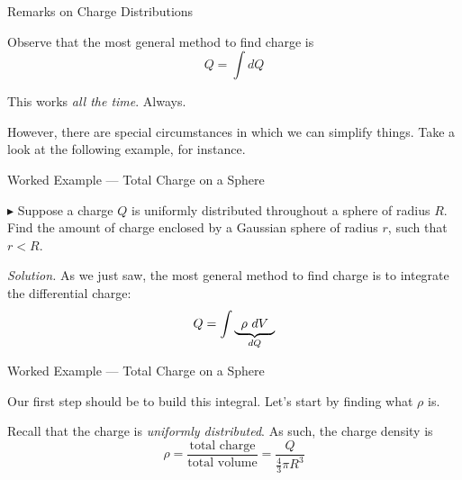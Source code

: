 \documentclass{beamer}
\begin{document}
\begin{frame}{Remarks on Charge Distributions}

Observe that the most general method to find charge is
\begin{equation*}
    Q = \int dQ
\end{equation*}

This works \emph{all the time}. Always.

\vfill

However, there are special circumstances in which we can simplify things. Take a look at the following example, for instance.

\end{frame}

\begin{frame}{Worked Example --- Total Charge on a Sphere}

$\blacktriangleright$ Suppose a charge $Q$ is uniformly distributed throughout a sphere of radius $R$. Find the amount of charge enclosed by a Gaussian sphere of radius $r$, such that $r < R$.

\vfill

\textit{Solution.} As we just saw, the most general method to find charge is to integrate the differential charge:
\begin{equation*}
    Q = \int \underbrace{\hspace{0.5em}\rho\ dV\hspace{0.5em}}_{dQ}
\end{equation*}

\end{frame}

\begin{frame}{Worked Example --- Total Charge on a Sphere}

Our first step should be to build this integral. Let's start by finding what $\rho$ is.

\vfill

Recall that the charge is \emph{uniformly distributed}. As such, the charge density is
\begin{equation*}
    \rho = \frac{\text{total charge}}{\text{total volume}} = \frac{Q}{\frac{4}{3}\pi R^3}
\end{equation*}

\end{frame}
\end{document}
